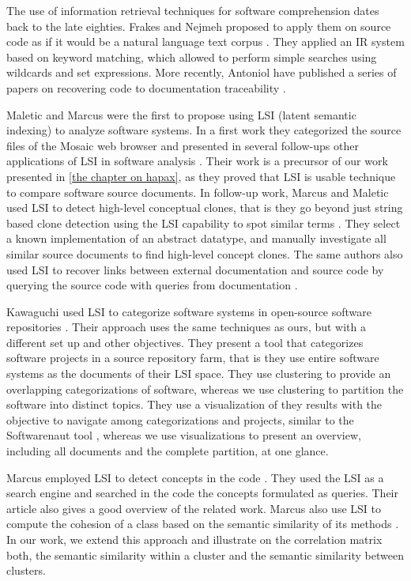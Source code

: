 The use of information retrieval techniques for software comprehension dates back to the late eighties. Frakes and Nejmeh proposed to apply them on source code as if it would be a natural language text corpus \cite{Frak87a}. They applied an IR system based on keyword matching, which allowed to perform simple searches using wildcards and set expressions. More recently, Antoniol \etal have published a series of papers on recovering code to documentation traceability \cite{Anto00c,Anto02b}. 

Maletic and Marcus were the first to propose using LSI (latent semantic indexing) to analyze software systems. In a first work they categorized the source files of the Mosaic web browser and presented in several follow-ups other applications of LSI in software analysis \cite{Male00a}. Their work is a precursor of our work presented  in \autoref{the chapter on hapax}, as they proved that LSI is usable technique to compare software source documents. In follow-up work, Marcus and Maletic used LSI to detect high-level conceptual clones, that is they go beyond just string based clone detection using the LSI capability to spot similar terms \cite{Marc01a}. They
select a known implementation of an abstract datatype, and manually investigate all similar source documents to find high-level concept clones. The same authors also used LSI to recover links between external documentation and source code by querying the source code with queries from documentation \cite{Marc03b}.

Kawaguchi \etal used LSI to categorize software systems in open-source software repositories \cite{Kawa04a}. Their approach uses the same techniques as ours, but with a different set up and other objectives. They present a tool that categorizes software projects in a source repository farm, that is they use entire software systems as the documents of their LSI space. They use clustering to provide an overlapping categorizations of software, whereas we use clustering to partition the software into distinct topics. They use a visualization of they results with the objective to navigate among categorizations and projects, similar to the Softwarenaut tool \cite{Lung06a}, whereas we use visualizations to present an overview, including all documents and the complete partition, at one glance.

Marcus \etal employed LSI to detect concepts in the code \cite{Marc04a}. They used the LSI as a search engine and searched in the code the concepts formulated as queries. Their  article also gives a good overview of the related work. Marcus \etal also use LSI to compute the cohesion of a class based on the semantic similarity of its methods \cite{Marc05a}. In our work, we extend this approach and illustrate on the correlation matrix both, the semantic similarity within a cluster and the semantic similarity between clusters.

